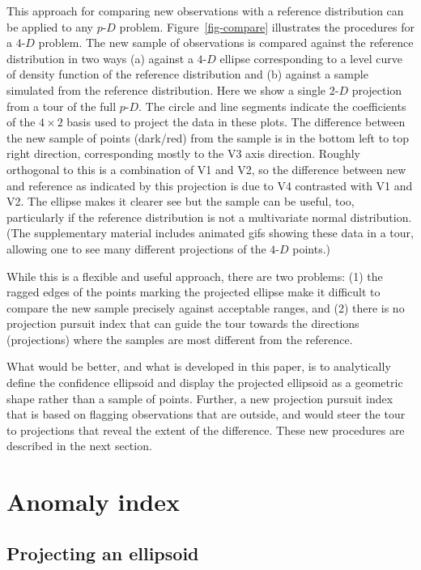 \documentclass[
  12pt,
]{interact}
\newcommand\pD{$p\text{-}D$}
\newcommand\gD{$2\text{-}D$}
\newcommand\fD{$4\text{-}D$}
\begin{document}
This approach for comparing new observations with a reference
distribution can be applied to any \pD{} problem.
Figure~\ref{fig-compare} illustrates the procedures for a \fD{} problem.
The new sample of observations is compared against the reference
distribution in two ways (a) against a \fD{} ellipse corresponding to a
level curve of density function of the reference distribution and (b)
against a sample simulated from the reference distribution. Here we show
a single \gD{} projection from a tour of the full \pD{}. The circle and
line segments indicate the coefficients of the \(4\times 2\) basis used
to project the data in these plots. The difference between the new
sample of points (dark/red) from the sample is in the bottom left to top
right direction, corresponding mostly to the V3 axis direction. Roughly
orthogonal to this is a combination of V1 and V2, so the difference
between new and reference as indicated by this projection is due to V4
contrasted with V1 and V2. The ellipse makes it clearer see but the
sample can be useful, too, particularly if the reference distribution is
not a multivariate normal distribution. (The supplementary material
includes animated gifs showing these data in a tour, allowing one to see
many different projections of the \fD{} points.)

While this is a flexible and useful approach, there are two problems:
(1) the ragged edges of the points marking the projected ellipse make it
difficult to compare the new sample precisely against acceptable ranges,
and (2) there is no projection pursuit index that can guide the tour
towards the directions (projections) where the samples are most
different from the reference.

What would be better, and what is developed in this paper, is to
analytically define the confidence ellipsoid and display the projected
ellipsoid as a geometric shape rather than a sample of points. Further,
a new projection pursuit index that is based on flagging observations
that are outside, and would steer the tour to projections that reveal
the extent of the difference. These new procedures are described in the
next section.

\section{Anomaly index}\label{sec-anomaly-index}

\subsection{Projecting an ellipsoid}\label{projecting-an-ellipsoid}
\end{document}
